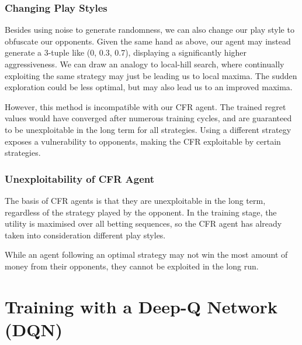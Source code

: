 \documentclass{article}
\begin{document}
\subsubsection{Changing Play Styles}
Besides using noise to generate randomness, we can also change our play style to obfuscate our opponents. Given the same hand as above, our agent may instead generate a 3-tuple like (0, 0.3, 0.7), displaying a significantly higher aggressiveness. We can draw an analogy to local-hill search, where continually exploiting the same strategy may just be leading us to local maxima. The sudden exploration could be less optimal, but may also lead us to an improved maxima.

However, this method is incompatible with our CFR agent. The trained regret values would have converged after numerous training cycles, and are guaranteed to be unexploitable in the long term for all strategies. Using a different strategy exposes a vulnerability to opponents, making the CFR exploitable by certain strategies.

\subsubsection{Unexploitability of CFR Agent}

The basis of CFR agents is that they are unexploitable in the long term, regardless of the strategy played by the opponent. In the training stage, the utility is maximised over all betting sequences, so the CFR agent has already taken into consideration different play styles.



While an agent following an optimal strategy may not win the most amount of money from their opponents, they cannot be exploited in the long run. 

\section{Training with a Deep-Q Network (DQN)}
\end{document}
